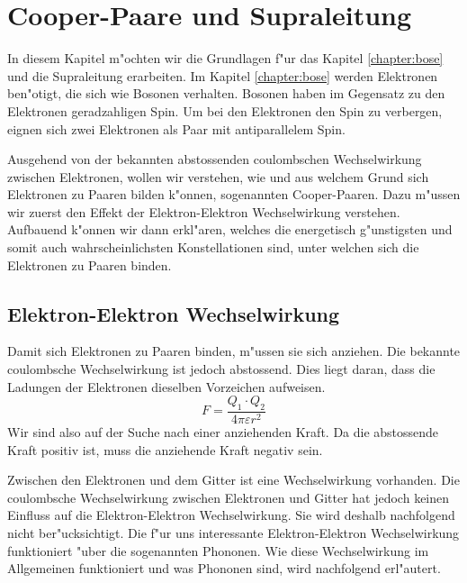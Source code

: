 \chapter{Cooper-Paare und Supraleitung\label{chapter:supraleitung}}
\begin{refsection}

In diesem Kapitel m"ochten wir die Grundlagen f"ur das Kapitel \ref{chapter:bose} und
die Supraleitung erarbeiten. Im Kapitel \ref{chapter:bose} werden Elektronen ben"otigt,
die sich wie  Bosonen verhalten. Bosonen haben im Gegensatz zu den Elektronen
geradzahligen Spin. Um bei den Elektronen den Spin zu verbergen, eignen sich zwei Elektronen als Paar mit
antiparallelem Spin.

Ausgehend von der bekannten abstossenden coulombschen Wechselwirkung zwischen Elektronen,
wollen wir verstehen, wie und aus welchem Grund sich Elektronen zu Paaren bilden k"onnen,
sogenannten  Cooper-Paaren.
Dazu m"ussen wir zuerst den Effekt der Elektron-Elektron Wechselwirkung verstehen.
Aufbauend k"onnen wir dann erkl"aren, welches die energetisch g"unstigsten und somit auch
wahrscheinlichsten Konstellationen sind, unter welchen sich die Elektronen zu Paaren binden.

\section{Elektron-Elektron Wechselwirkung\label{supraleitung:elektronelektronwechselwirkung}}
Damit sich Elektronen zu Paaren binden, m"ussen sie sich anziehen.
Die bekannte coulombsche Wechselwirkung ist jedoch abstossend.
Dies liegt daran, dass die Ladungen der Elektronen dieselben Vorzeichen aufweisen.
\begin{equation}
F = \frac{Q_1\cdot Q_2}{4\pi \varepsilon r^2}
\label{supraleitung:Coulomb}
\end{equation}
Wir sind also auf der Suche nach einer anziehenden Kraft.
Da die abstossende Kraft positiv ist, muss die anziehende Kraft negativ sein.

Zwischen den Elektronen und dem Gitter ist eine Wechselwirkung vorhanden.
Die coulombsche Wechselwirkung zwischen Elektronen und Gitter hat jedoch keinen Einfluss auf die
Elektron-Elektron Wechselwirkung.
Sie wird deshalb nachfolgend nicht ber"ucksichtigt.
Die f"ur uns interessante Elektron-Elektron Wechselwirkung funktioniert "uber die sogenannten Phononen.
Wie diese Wechselwirkung im Allgemeinen funktioniert und was Phononen sind, wird nachfolgend erl"autert.


\end{refsection}
